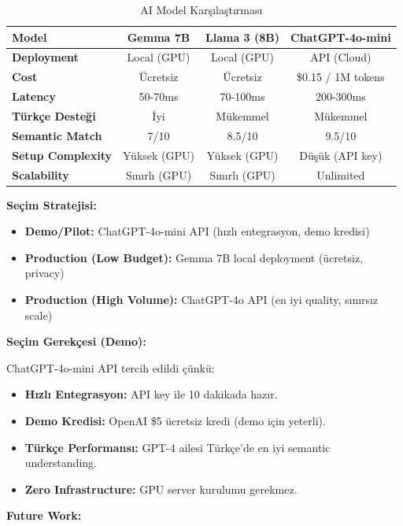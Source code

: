 \documentclass[a4paper,12pt]{report}
\begin{document}
\begin{table}[h]
\centering
\small
\begin{tabular}{|l|c|c|c|}
\hline
\textbf{Model} & \textbf{Gemma 7B} & \textbf{Llama 3 (8B)} & \textbf{ChatGPT-4o-mini} \\ \hline
\textbf{Deployment} & Local (GPU) & Local (GPU) & API (Cloud) \\ \hline
\textbf{Cost} & Ücretsiz & Ücretsiz & \$0.15 / 1M tokens \\ \hline
\textbf{Latency} & 50-70ms & 70-100ms & 200-300ms \\ \hline
\textbf{Türkçe Desteği} & İyi & Mükemmel & Mükemmel \\ \hline
\textbf{Semantic Match} & 7/10 & 8.5/10 & 9.5/10 \\ \hline
\textbf{Setup Complexity} & Yüksek (GPU) & Yüksek (GPU) & Düşük (API key) \\ \hline
\textbf{Scalability} & Sınırlı (GPU) & Sınırlı (GPU) & Unlimited \\ \hline
\end{tabular}
\caption{AI Model Karşılaştırması}
\end{table}

\textbf{Seçim Stratejisi:}

\begin{itemize}
    \item \textbf{Demo/Pilot:} ChatGPT-4o-mini API (hızlı entegrasyon, demo kredisi)
    \item \textbf{Production (Low Budget):} Gemma 7B local deployment (ücretsiz, privacy)
    \item \textbf{Production (High Volume):} ChatGPT-4o API (en iyi quality, sınırsız scale)
\end{itemize}

\textbf{Seçim Gerekçesi (Demo):}

ChatGPT-4o-mini API tercih edildi çünkü:
\begin{itemize}
    \item \textbf{Hızlı Entegrasyon:} API key ile 10 dakikada hazır.
    \item \textbf{Demo Kredisi:} OpenAI \$5 ücretsiz kredi (demo için yeterli).
    \item \textbf{Türkçe Performansı:} GPT-4 ailesi Türkçe'de en iyi semantic understanding.
    \item \textbf{Zero Infrastructure:} GPU server kurulumu gerekmez.
\end{itemize}

\textbf{Future Work:}
\end{document}
